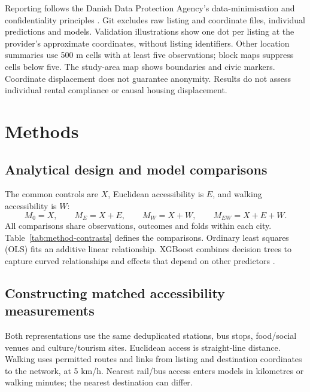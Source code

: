 \documentclass[11pt,a4paper,oneside,openany]{memoir}
\begin{document}
Reporting follows the Danish Data Protection Agency's data-minimisation and
confidentiality principles \parencite{data_dpa_principles}. Git excludes raw
listing and coordinate files, individual predictions and models. Validation
illustrations show one dot per listing at the provider's approximate coordinates,
without listing identifiers. Other location summaries use 500 m cells with at
least five observations; block maps suppress cells below five. The study-area
map shows boundaries and civic markers.
Coordinate displacement does not guarantee anonymity. Results do not assess
individual rental compliance or causal housing displacement.

\chapter{Methods}
\label{ch:methods}

\section{Analytical design and model comparisons}
\label{sec:model-design}
The common controls are $X$, Euclidean accessibility is $E$, and walking
accessibility is $W$:
\[
 M_0=X,\qquad M_E=X+E,\qquad M_W=X+W,\qquad M_{EW}=X+E+W.
\]
All comparisons share observations, outcomes and folds within each city.
Table~\ref{tab:method-contrasts} defines the comparisons. Ordinary least squares
(OLS) fits an
additive linear relationship. XGBoost combines decision trees to capture
curved relationships and effects that depend on other predictors
\parencite{methods_chen2016}.



\section{Constructing matched accessibility measurements}
\label{sec:accessibility-method}
Both representations use the same deduplicated stations, bus stops, food/social
venues and culture/tourism sites. Euclidean access is straight-line distance.
Walking uses permitted routes and links from listing and destination coordinates
to the network, at 5 km/h. Nearest rail/bus access enters models in kilometres
or walking minutes; the nearest destination can differ.
\end{document}

